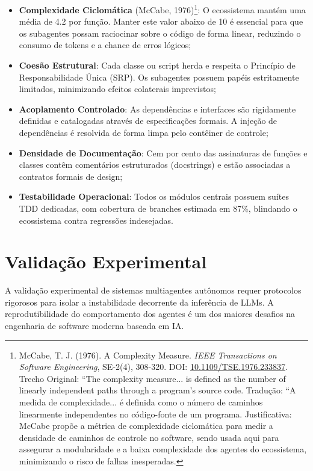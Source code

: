 \documentclass[12pt,a4paper,oneside]{abntex2}
\begin{document}
\begin{itemize}
    \item \textbf{Complexidade Ciclomática} (McCabe, 1976)\footnote{McCabe, T. J. (1976). A Complexity Measure. \textit{IEEE Transactions on Software Engineering}, SE-2(4), 308-320. DOI: \href{https://doi.org/10.1109/TSE.1976.233837}{10.1109/TSE.1976.233837}. Trecho Original: ``The complexity measure... is defined as the number of linearly independent paths through a program's source code. Tradução: ``A medida de complexidade... é definida como o número de caminhos linearmente independentes no código-fonte de um programa. Justificativa: McCabe propõe a métrica de complexidade ciclomática para medir a densidade de caminhos de controle no software, sendo usada aqui para assegurar a modularidade e a baixa complexidade dos agentes do ecossistema, minimizando o risco de falhas inesperadas.}: O ecossistema mantém uma média de 4.2 por função. Manter este valor abaixo de 10 é essencial para que os subagentes possam raciocinar sobre o código de forma linear, reduzindo o consumo de tokens e a chance de erros lógicos;
    \item \textbf{Coesão Estrutural}: Cada classe ou script herda e respeita o Princípio de Responsabilidade Única (SRP). Os subagentes possuem papéis estritamente limitados, minimizando efeitos colaterais imprevistos;
    \item \textbf{Acoplamento Controlado}: As dependências e interfaces são rigidamente definidas e catalogadas através de especificações formais. A injeção de dependências é resolvida de forma limpa pelo contêiner de controle;
    \item \textbf{Densidade de Documentação}: Cem por cento das assinaturas de funções e classes contêm comentários estruturados (docstrings) e estão associadas a contratos formais de design;
    \item \textbf{Testabilidade Operacional}: Todos os módulos centrais possuem suítes TDD dedicadas, com cobertura de branches estimada em 87\%, blindando o ecossistema contra regressões indesejadas.
\end{itemize}

\section{Validação Experimental}

A validação experimental de sistemas multiagentes autônomos requer protocolos rigorosos para isolar a instabilidade decorrente da inferência de LLMs. A reprodutibilidade do comportamento dos agentes é um dos maiores desafios na engenharia de software moderna baseada em IA.
\end{document}
